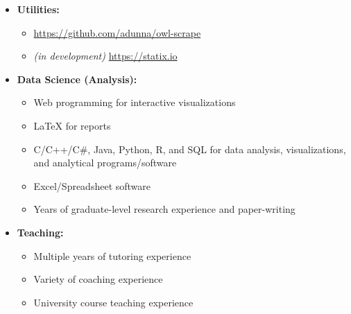 \documentclass[letterpaper,11pt]{article}
\begin{document}
\begin{itemize}
  \item \textbf{Utilities:}
  \begin{itemize}
  \item \href{https://github.com/adunna/owl-scrape}{https://github.com/adunna/owl-scrape}
  \item \textit{(in development)} \href{https://statix.io}{https://statix.io}
  \end{itemize}
  \item \textbf{Data Science (Analysis):}
  \begin{itemize}
  \item Web programming for interactive visualizations
  \item LaTeX for reports
  \item C/C++/C\#, Java, Python, R, and SQL for data analysis, visualizations, and analytical programs/software
  \item Excel/Spreadsheet software
  \item Years of graduate-level research experience and paper-writing
  \end{itemize}
  \item \textbf{Teaching:}
  \begin{itemize}
  \item Multiple years of tutoring experience
  \item Variety of coaching experience
  \item University course teaching experience
  \end{itemize}
\end{itemize}
\end{document}
